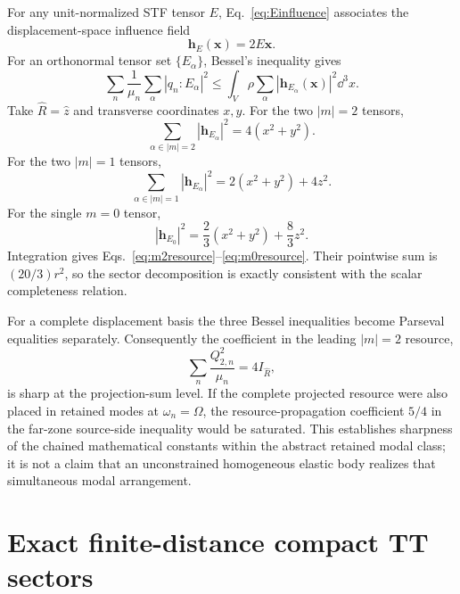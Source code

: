 For any unit-normalized STF tensor $E$, Eq.~\eqref{eq:Einfluence} associates the displacement-space influence field
\begin{equation}
\bm h_E(\bm x)=2E\bm x .
\end{equation}
For an orthonormal tensor set $\{E_\alpha\}$, Bessel's inequality gives
\begin{equation}
\sum_n\frac{1}{\mu_n}
\sum_\alpha|q_n:E_\alpha|^2
\le
\int_V\rho
\sum_\alpha|\bm h_{E_\alpha}(\bm x)|^2\dd^3x .
\end{equation}
Take $\hat R=\hat z$ and transverse coordinates $x,y$. For the two $|m|=2$ tensors,
\begin{equation}
\sum_{\alpha\in |m|=2}|\bm h_{E_\alpha}|^2
=4(x^2+y^2).
\end{equation}
For the two $|m|=1$ tensors,
\begin{equation}
\sum_{\alpha\in |m|=1}|\bm h_{E_\alpha}|^2
=2(x^2+y^2)+4z^2.
\end{equation}
For the single $m=0$ tensor,
\begin{equation}
|\bm h_{E_0}|^2
=\frac23(x^2+y^2)+\frac83z^2.
\end{equation}
Integration gives Eqs.~\eqref{eq:m2resource}--\eqref{eq:m0resource}. Their pointwise sum is $(20/3)r^2$, so the sector decomposition is exactly consistent with the scalar completeness relation.

For a complete displacement basis the three Bessel inequalities become Parseval equalities separately. Consequently the coefficient in the leading $|m|=2$ resource,
\begin{equation}
\sum_n\frac{Q_{2,n}^2}{\mu_n}=4I_{\hat R},
\end{equation}
is sharp at the projection-sum level. If the complete projected resource were also placed in retained modes at $\omega_n=\Omega$, the resource-propagation coefficient $5/4$ in the far-zone source-side inequality would be saturated. This establishes sharpness of the chained mathematical constants within the abstract retained modal class; it is not a claim that an unconstrained homogeneous elastic body realizes that simultaneous modal arrangement.

\section{Exact finite-distance compact TT sectors}
\label{app:finiteTT}

